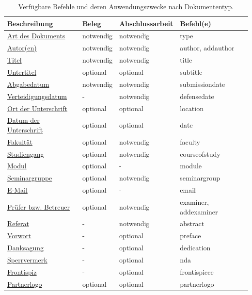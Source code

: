 	\begin{table}[!htb]
		\def\yes{notwendig}
		\def\no{-}
		\def\maybe{optional}
		
		\centering
		\caption{Verfügbare Befehle und deren Anwendungszwecke nach Dokumententyp.}
		\label{tab:macros}
		\begin{tabular}{llll}
			\toprule
			\textbf{Beschreibung} & \textbf{Beleg} & \textbf{Abschlussarbeit} & \textbf{Befehl(e)} \\
			\midrule
			\hyperref[cmd:type]{Art des Dokuments} & \yes & \yes & type \\
			\hyperref[cmd:author]{Autor(en)} & \yes & \yes & author, addauthor \\
			\hyperref[cmd:title]{Titel} & \yes & \yes & title \\
			\hyperref[cmd:subtitle]{Untertitel} & \maybe & \maybe & subtitle \\
			\hyperref[cmd:submissiondate]{Abgabedatum} & \yes & \yes & submissiondate \\
			\hyperref[cmd:defensedate]{Verteidigungsdatum} & \no & \yes & defensedate \\
			\hyperref[cmd:location]{Ort der Unterschrift} & \maybe & \maybe & location \\
			\hyperref[cmd:date]{Datum der Unterschrift} & \maybe & \maybe & date \\
			\hyperref[cmd:faculty]{Fakultät} & \maybe & \yes & faculty \\
			\hyperref[cmd:courseofstudy]{Studiengang} & \maybe & \yes & courseofstudy \\
			\hyperref[cmd:module]{Modul} & \maybe & \no & module \\
			\hyperref[cmd:seminargroup]{Seminargruppe} & \maybe & \yes & seminargroup \\
			\hyperref[cmd:email]{E-Mail} & \maybe & \no & email \\
			\hyperref[cmd:examiner]{Prüfer bzw. Betreuer} & \maybe & \yes & examiner, addexaminer \\
			\hyperref[cmd:abstract]{Referat} & \no & \yes & abstract \\
			\hyperref[cmd:preface]{Vorwort} & \no & \maybe & preface \\
			\hyperref[cmd:dedication]{Danksagung} & \no & \maybe & dedication \\
			\hyperref[cmd:nda]{Sperrvermerk} & \no & \maybe & nda \\
			\hyperref[cmd:frontispiece]{Frontispiz} & \no & \maybe & frontispiece \\
			\hyperref[cmd:partnerlogo]{Partnerlogo} & \maybe & \maybe & partnerlogo \\
			\bottomrule
		\end{tabular}
	\end{table}
	
